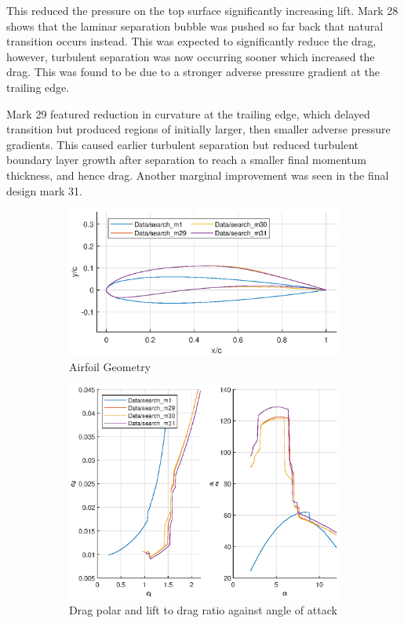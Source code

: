\documentclass{article}
\begin{document}
This reduced the pressure on the top surface significantly increasing lift.
Mark 28 shows that the laminar separation bubble was pushed so far back that natural transition occurs instead.
This was expected to significantly reduce the drag, however, turbulent separation was now occurring sooner which increased the drag.
This was found to be due to a stronger adverse pressure gradient at the trailing edge.

Mark 29 featured reduction in curvature at the trailing edge, which delayed transition but produced regions of initially larger, then smaller adverse pressure gradients.
This caused earlier turbulent separation but reduced turbulent boundary layer growth after separation to reach a smaller final momentum thickness, and hence drag.
Another marginal improvement was seen in the final design mark 31. 

\begin{figure}[H]
    \begin{subfigure}{0.54\textwidth}
        \centering
        \includegraphics[width=1.2\textwidth, center]{figures/loRe_geometry_31.eps}
        \caption{Airfoil Geometry}
        \label{fig:m31_geometry}
    \end{subfigure}
    \begin{subfigure}{0.45\textwidth}
        \centering
        \includegraphics[width=1.2\textwidth, center]{figures/loRe_lod_31.eps}
        \caption{Drag polar and lift to drag ratio against angle of attack}
        \label{fig:m31_lod}
    \end{subfigure}
    \caption{}
\end{figure}
\end{document}

